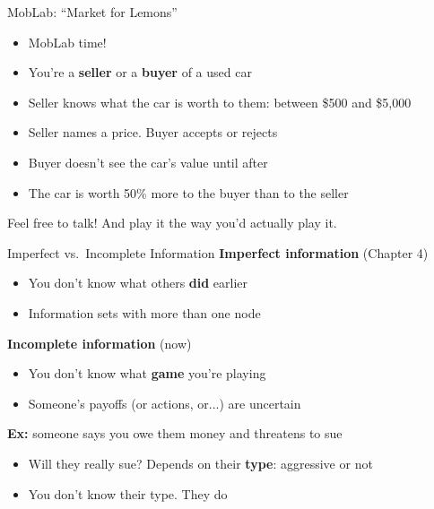 \begin{frame}{MobLab: ``Market for Lemons''}
\begin{itemize}
    \item MobLab time!
    \item You're a \textbf{seller} or a \textbf{buyer} of a used car
    \item Seller knows what the car is worth to them: between \$500 and \$5{,}000
    \item Seller names a price. Buyer accepts or rejects
    \item Buyer doesn't see the car's value until after
    \item The car is worth 50\% more to the buyer than to the seller
\end{itemize}
\vfill
\centering
Feel free to talk! And play it the way you'd actually play it.
\vspace{-0.2in}
\end{frame}

\begin{frame}{Imperfect vs.\ Incomplete Information}
\textbf{Imperfect information} (Chapter 4)
\begin{itemize}
    \item You don't know what others \textbf{did} earlier
    \item Information sets with more than one node
\end{itemize}
\bsk
\textbf{Incomplete information} (now)
\begin{itemize}
    \item You don't know what \textbf{game} you're playing
    \item Someone's payoffs (or actions, or...) are uncertain
\end{itemize}
\bsk
\textbf{Ex:} someone says you owe them money and threatens to sue
\begin{itemize}
    \item Will they really sue? Depends on their \textbf{type}: aggressive or not
    \item You don't know their type. They do
\end{itemize}
\vspace{-0.3in}
\end{frame}

